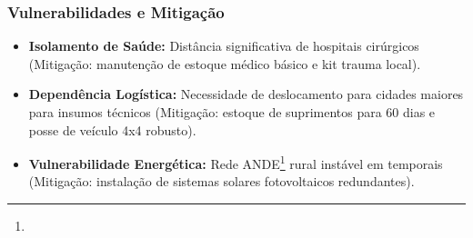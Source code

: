 \subsubsection{Vulnerabilidades e
Mitigação}

\begin{itemize}
\tightlist
\item
  \textbf{Isolamento de Saúde:} Distância significativa de hospitais
  cirúrgicos (Mitigação: manutenção de estoque médico básico e kit
  trauma local).
\item
  \textbf{Dependência Logística:} Necessidade de deslocamento para
  cidades maiores para insumos técnicos (Mitigação: estoque de
  suprimentos para 60 dias e posse de veículo 4x4 robusto).
\item
  \textbf{Vulnerabilidade Energética:} Rede ANDE\footnote{\fineANDE} rural instável em
  temporais (Mitigação: instalação de sistemas solares fotovoltaicos
  redundantes).
\end{itemize}


